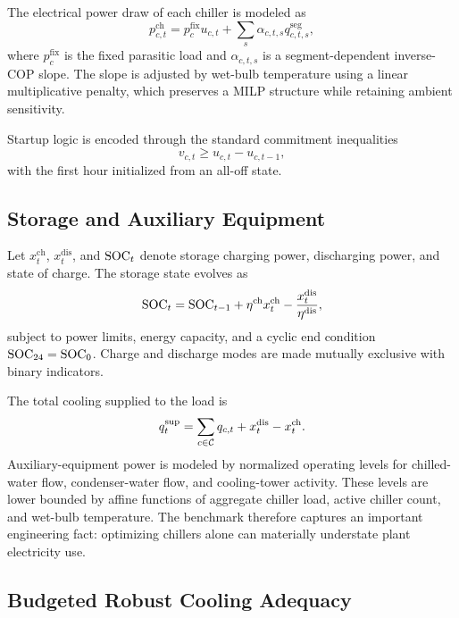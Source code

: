 The electrical power draw of each chiller is modeled as
\begin{equation}
p^{\mathrm{ch}}_{c,t} = p^{\mathrm{fix}}_{c} u_{c,t} + \sum_{s} \alpha_{c,t,s} q^{\mathrm{seg}}_{c,t,s},
\end{equation}
where $p^{\mathrm{fix}}_{c}$ is the fixed parasitic load and $\alpha_{c,t,s}$ is a segment-dependent inverse-COP slope. The slope is adjusted by wet-bulb temperature using a linear multiplicative penalty, which preserves a MILP structure while retaining ambient sensitivity.

Startup logic is encoded through the standard commitment inequalities
\begin{equation}
v_{c,t} \ge u_{c,t} - u_{c,t-1},
\end{equation}
with the first hour initialized from an all-off state.

\subsection{Storage and Auxiliary Equipment}

Let $x^{\mathrm{ch}}_t$, $x^{\mathrm{dis}}_t$, and $\mathrm{SOC}_t$ denote storage charging power, discharging power, and state of charge. The storage state evolves as
\begin{equation}
\mathrm{SOC}_t = \mathrm{SOC}_{t-1} + \eta^{\mathrm{ch}} x^{\mathrm{ch}}_t - \frac{x^{\mathrm{dis}}_t}{\eta^{\mathrm{dis}}},
\end{equation}
subject to power limits, energy capacity, and a cyclic end condition $\mathrm{SOC}_{24} = \mathrm{SOC}_0$. Charge and discharge modes are made mutually exclusive with binary indicators.

The total cooling supplied to the load is
\begin{equation}
q^{\mathrm{sup}}_t = \sum_{c \in \mathcal{C}} q_{c,t} + x^{\mathrm{dis}}_t - x^{\mathrm{ch}}_t.
\end{equation}
Auxiliary-equipment power is modeled by normalized operating levels for chilled-water flow, condenser-water flow, and cooling-tower activity. These levels are lower bounded by affine functions of aggregate chiller load, active chiller count, and wet-bulb temperature. The benchmark therefore captures an important engineering fact: optimizing chillers alone can materially understate plant electricity use.

\subsection{Budgeted Robust Cooling Adequacy}

